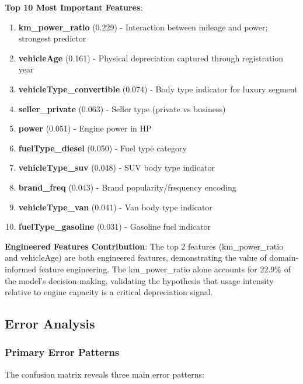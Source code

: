 \documentclass[12pt, a4paper]{article}
\begin{document}
\textbf{Top 10 Most Important Features}:
\begin{enumerate}
    \item \textbf{km\_power\_ratio} (0.229) - Interaction between mileage and power; strongest predictor
    \item \textbf{vehicleAge} (0.161) - Physical depreciation captured through registration year
    \item \textbf{vehicleType\_convertible} (0.074) - Body type indicator for luxury segment
    \item \textbf{seller\_private} (0.063) - Seller type (private vs business)
    \item \textbf{power} (0.051) - Engine power in HP
    \item \textbf{fuelType\_diesel} (0.050) - Fuel type category
    \item \textbf{vehicleType\_suv} (0.048) - SUV body type indicator
    \item \textbf{brand\_freq} (0.043) - Brand popularity/frequency encoding
    \item \textbf{vehicleType\_van} (0.041) - Van body type indicator
    \item \textbf{fuelType\_gasoline} (0.031) - Gasoline fuel indicator
\end{enumerate}

\textbf{Engineered Features Contribution}: The top 2 features (km\_power\_ratio and vehicleAge) are both engineered features, demonstrating the value of domain-informed feature engineering. The km\_power\_ratio alone accounts for 22.9\% of the model's decision-making, validating the hypothesis that usage intensity relative to engine capacity is a critical depreciation signal.

\subsection{Error Analysis}

\subsubsection{Primary Error Patterns}
The confusion matrix reveals three main error patterns:
\end{document}
